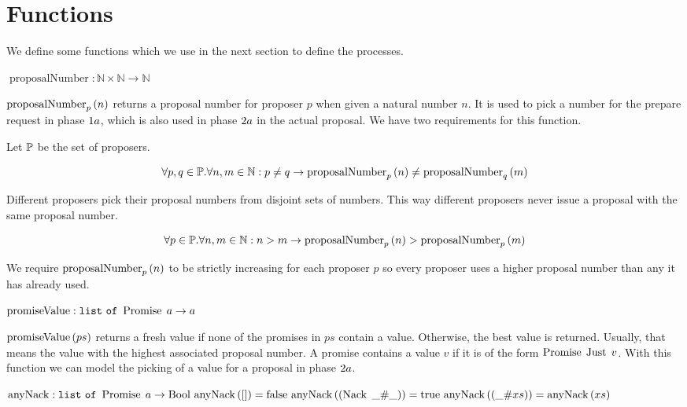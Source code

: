 \section{Functions}
We define some functions which we use in the next section to define the processes.

$\operatorname{proposalNumber} : \mathbb{N} \times \mathbb{N} \to \mathbb{N}$

$\proposalNumber{n}{p}$ returns a proposal number for proposer $p$ when given a natural number $n$.
It is used to pick a number for the prepare request in phase $\POneA$, which is also used in phase $\PTwoA$ in the actual proposal.
We have two requirements for this function.

Let $\SetOfProposers$ be the set of proposers.

\[\forall p,q \in \SetOfProposers . \forall n,m \in \mathbb{N}: p \neq q \to \proposalNumber{n}{p} \neq \proposalNumber{m}{q}\]

Different proposers pick their proposal numbers from disjoint sets of numbers.
This way different proposers never issue a proposal with the same proposal number.

\[\forall p \in \SetOfProposers . \forall n,m \in \mathbb{N}: n > m \to \proposalNumber{n}{p} > \proposalNumber{m}{p}\]

We require $\proposalNumber{n}{p}$ to be strictly increasing for each proposer $p$ so every proposer uses a higher proposal number than any it has already used.


$\operatorname{promiseValue} : \List{\Promise{a}} \to a$

$\promiseValue{ps}$ returns a fresh value if none of the promises in $ps$ contain a value. Otherwise, the best value is returned. Usually, that means the value with the highest associated proposal number.
A promise contains a value $v$ if it is of the form $\Promise{\Just{v}}$.
With this function we can model the picking of a value for a proposal in phase $\PTwoA$.

$\operatorname{anyNack} : \List{\Promise{a}} \to \Bool\\
\anyNack{\EmptyList} = \False\\
\anyNack{\ListPattern{\Nack{\Wildcard}}{\Wildcard}} = \True\\
\anyNack{\ListPattern{\Wildcard}{xs}} = \anyNack{xs}$

